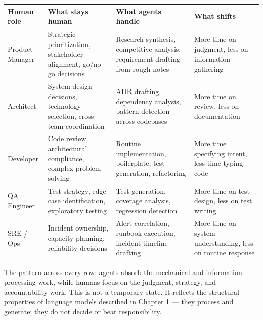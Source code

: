 \documentclass[
  a4paper,
  DIV=11,
  numbers=noendperiod]{scrreprt}
\newcounter{none} %
\begin{document}
{\def\LTcaptype{none} %
\begin{longtable}[]{@{}
  >{\raggedright\arraybackslash}p{}
  >{\raggedright\arraybackslash}p{}
  >{\raggedright\arraybackslash}p{}
  >{\raggedright\arraybackslash}p{}@{}}
\toprule\noalign{}
\begin{minipage}[b]{\linewidth}\raggedright
Human role
\end{minipage} & \begin{minipage}[b]{\linewidth}\raggedright
What stays human
\end{minipage} & \begin{minipage}[b]{\linewidth}\raggedright
What agents handle
\end{minipage} & \begin{minipage}[b]{\linewidth}\raggedright
What shifts
\end{minipage} \\
\midrule\noalign{}
\endhead
\bottomrule\noalign{}
\endlastfoot
Product Manager & Strategic prioritization, stakeholder alignment,
go/no-go decisions & Research synthesis, competitive analysis,
requirement drafting from rough notes & More time on judgment, less on
information gathering \\
Architect & System design decisions, technology selection, cross-team
coordination & ADR drafting, dependency analysis, pattern detection
across codebases & More time on review, less on documentation \\
Developer & Code review, architectural compliance, complex
problem-solving & Routine implementation, boilerplate, test generation,
refactoring & More time specifying intent, less time typing code \\
QA Engineer & Test strategy, edge case identification, exploratory
testing & Test generation, coverage analysis, regression detection &
More time on test design, less on test writing \\
SRE / Ops & Incident ownership, capacity planning, reliability decisions
& Alert correlation, runbook execution, incident timeline drafting &
More time on system understanding, less on routine response \\
\end{longtable}
}

The pattern across every row: agents absorb the mechanical and
information-processing work, while humans focus on the judgment,
strategy, and accountability work. This is not a temporary state. It
reflects the structural properties of language models described in
Chapter 1 --- they process and generate; they do not decide or bear
responsibility.
\end{document}
